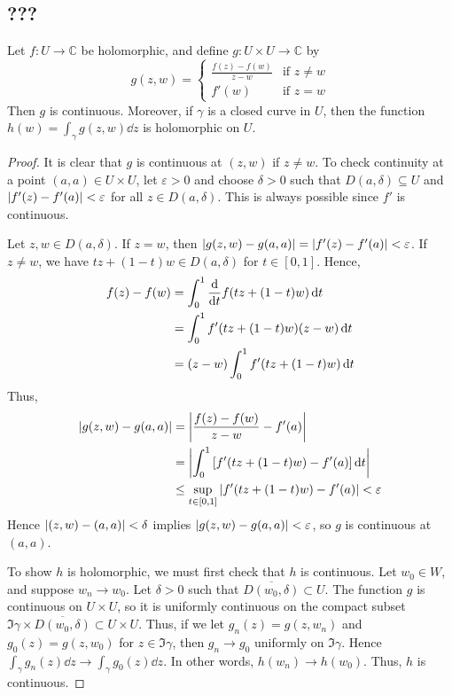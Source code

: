 \subsection{???}
\begin{lemma}
	Let \( f \colon U \to \mathbb C \) be holomorphic, and define \( g \colon U \times U \to \mathbb C \) by
	\[ g(z,w) = \begin{cases}
		\frac{f(z) - f(w)}{z-w} & \text{if } z \neq w \\
		f'(w) & \text{if } z = w
	\end{cases} \]
	Then \( g \) is continuous.
	Moreover, if \( \gamma \) is a closed curve in \( U \), then the function \( h(w) = \int_\gamma g(z,w) \dd{z} \) is holomorphic on \( U \).
\end{lemma}
\begin{proof}
	It is clear that \( g \) is continuous at \( (z,w) \) if \( z \neq w \).
	To check continuity at a point \( (a,a) \in U \times U \), let \( \varepsilon > 0 \) and choose \( \delta > 0 \) such that \( D(a,\delta) \subseteq U \) and \( \abs{f'(z) - f'(a)} < \varepsilon \) for all \( z \in D(a,\delta) \).
	This is always possible since \( f' \) is continuous.

	Let \( z,w \in D(a,\delta) \).
	If \( z = w \), then \( \abs{g(z,w) - g(a,a)} = \abs{f'(z) - f'(a)} < \varepsilon \).
	If \( z \neq w \), we have \( tz + (1-t)w \in D(a,\delta) \) for \( t \in [0,1] \).
	Hence,
	\begin{align*}
		f(z) - f(w) &= \int_0^1 \dv{t} f(tz+(1-t)w) \dd{t} \\
		&= \int_0^1 f'(tz+(1-t)w)(z-w) \dd{t} \\
		&= (z-w) \int_0^1 f'(tz+(1-t)w) \dd{t}
	\end{align*}
	Thus,
	\begin{align*}
		\abs{g(z,w) - g(a,a)} &= \abs{\frac{f(z) - f(w)}{z-w} - f'(a)} \\
		&= \abs{\int_0^1 \qty[f'(tz+(1-t)w) - f'(a)] \dd{t}} \\
		&\leq \sup_{t \in [0,1]} \abs{f'(tz+(1-t)w) - f'(a)} < \varepsilon
	\end{align*}
	Hence \( \abs{(z,w) - (a,a)} < \delta \) implies \( \abs{g(z,w) - g(a,a)} < \varepsilon \), so \( g \) is continuous at \( (a,a) \).

	To show \( h \) is holomorphic, we must first check that \( h \) is continuous.
	Let \( w_0 \in W \), and suppose \( w_n \to w_0 \).
	Let \( \delta > 0 \) such that \( \overline{D(w_0, \delta)} \subset U \).
	The function \( g \) is continuous on \( U \times U \), so it is uniformly continuous on the compact subset \( \Im \gamma \times \overline{D(w_0,\delta)} \subset U \times U \).
	Thus, if we let \( g_n(z) = g(z,w_n) \) and \( g_0(z) = g(z,w_0) \) for \( z \in \Im \gamma \), then \( g_n \to g_0 \) uniformly on \( \Im \gamma \).
	Hence \( \int_\gamma g_n(z) \dd{z} \to \int_\gamma g_0(z) \dd{z} \).
	In other words, \( h(w_n) \to h(w_0) \).
	Thus, \( h \) is continuous.


\end{proof}
